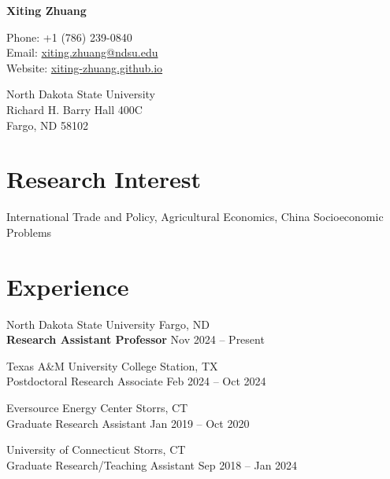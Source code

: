 \documentclass[10.5pt,letterpaper]{article}
\def\name{Xiting Zhuang}
\renewenvironment{itemize}{
	\begin{list}{}{
			\setlength{\leftmargin}{1.5em}
		}
	}{
	\end{list}
}
\begin{document}
	
	{\huge \textbf{\name}}
	
	\vspace{0.25in}
	
	\begin{minipage}[t]{0.45\textwidth}
		Phone: +1 (786) 239-0840 \\
		Email: \href{mailto:xiting.zhuang@ndsu.edu}{xiting.zhuang@ndsu.edu} \\
		Website: \href{https://xiting-zhuang.github.io}{xiting-zhuang.github.io} \\
	\end{minipage}
	\begin{minipage}[t]{0.6\textwidth}
		North Dakota State University \\ 
		Richard H. Barry Hall 400C \\
		Fargo, ND 58102 \\
	\end{minipage}
	
	\section*{\textbf{Research Interest}}
	International Trade and Policy, Agricultural Economics, China Socioeconomic Problems
	
	\section*{\textbf{Experience}}
	\begin{itemize}
		\item[-] North Dakota State University \hfill Fargo, ND \\
		\textbf{Research Assistant Professor} \hfill Nov 2024 – Present
		
		\item[-] Texas A\&M University \hfill College Station, TX \\
		Postdoctoral Research Associate \hfill Feb 2024 – Oct 2024
		
		\item[-] Eversource Energy Center \hfill Storrs, CT \\
		Graduate Research Assistant \hfill Jan 2019 – Oct 2020
		
		\item[-] University of Connecticut \hfill Storrs, CT \\
		Graduate Research/Teaching Assistant \hfill Sep 2018 – Jan 2024
	\end{itemize}
	
\end{document}
